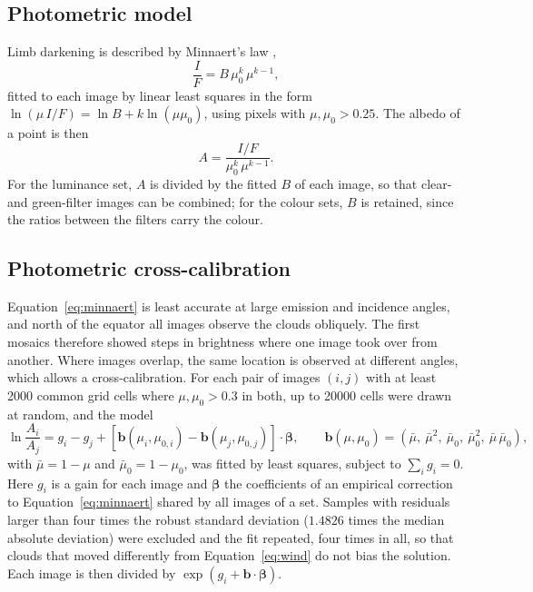 \documentclass[11pt,a4paper]{article}
\newcommand{\vect}[1]{\mathbf{#1}}
\begin{document}
\subsection{Photometric model}

Limb darkening is described by Minnaert's law \citep{minnaert1941},
\begin{equation}
\frac{I}{F} = B\,\mu_{0}^{k}\,\mu^{k-1},
\label{eq:minnaert}
\end{equation}
fitted to each image by linear least squares in the form
$\ln(\mu\,I/F) = \ln B + k\ln(\mu\mu_{0})$, using pixels with $\mu, \mu_{0} > 0.25$. The albedo of
a point is then
\begin{equation}
A = \frac{I/F}{\mu_{0}^{k}\,\mu^{k-1}}.
\label{eq:albedo}
\end{equation}
For the luminance set, $A$ is divided by the fitted $B$ of each image, so that clear- and
green-filter images can be combined; for the colour sets, $B$ is retained, since the ratios between
the filters carry the colour.

\subsection{Photometric cross-calibration}

Equation~\eqref{eq:minnaert} is least accurate at large emission and incidence angles, and north of
the equator all images observe the clouds obliquely. The first mosaics therefore showed steps in
brightness where one image took over from another. Where images overlap, the same location is
observed at different angles, which allows a cross-calibration. For each pair of images $(i, j)$
with at least 2000 common grid cells where $\mu, \mu_{0} > 0.3$ in both, up to \num{20000} cells
were drawn at random, and the model
\begin{equation}
\ln\frac{A_{i}}{A_{j}} = g_{i} - g_{j} +
\left[\vect{b}(\mu_{i}, \mu_{0,i}) - \vect{b}(\mu_{j}, \mu_{0,j})\right]\cdot\boldsymbol{\beta},
\qquad
\vect{b}(\mu, \mu_{0}) = \left(\bar\mu,\ \bar\mu^{2},\ \bar\mu_{0},\ \bar\mu_{0}^{2},\
\bar\mu\,\bar\mu_{0}\right),
\label{eq:selfcal}
\end{equation}
with $\bar\mu = 1 - \mu$ and $\bar\mu_{0} = 1 - \mu_{0}$, was fitted by least squares, subject to
$\sum_{i} g_{i} = 0$. Here $g_{i}$ is a gain for each image and $\boldsymbol{\beta}$ the
coefficients of an empirical correction to Equation~\eqref{eq:minnaert} shared by all images of a
set. Samples with residuals larger than four times the robust standard deviation
($1.4826$ times the median absolute deviation) were excluded and the fit repeated, four times in
all, so that clouds that moved differently from Equation~\eqref{eq:wind} do not bias the solution.
Each image is then divided by $\exp\left(g_{i} + \vect{b}\cdot\boldsymbol{\beta}\right)$.
\end{document}
